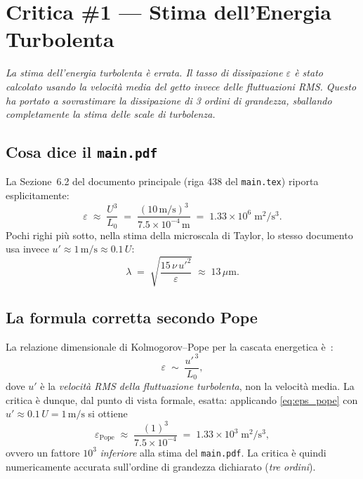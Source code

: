 \documentclass[11pt,a4paper]{article}
\newcommand{\mum}{\,\mu\mathrm{m}}
\begin{document}
\section{Critica \#1 — Stima dell'Energia Turbolenta}
\label{sec:c1}

\begin{citazione}
\textit{La stima dell'energia turbolenta è errata. Il tasso di
dissipazione $\varepsilon$ è stato calcolato usando la velocità
media del getto invece delle fluttuazioni RMS. Questo ha portato a
sovrastimare la dissipazione di 3 ordini di grandezza, sballando
completamente la stima delle scale di turbolenza.}
\end{citazione}

\subsection{Cosa dice il \texttt{main.pdf}}

La Sezione~6.2 del documento principale (riga 438 del
\texttt{main.tex}) riporta esplicitamente:
\begin{equation}
  \varepsilon \;\approx\; \frac{U^{3}}{L_{0}}
   \;=\; \frac{(10\,\mathrm{m/s})^{3}}{7.5\times 10^{-4}\,\mathrm{m}}
   \;=\; 1.33\times 10^{6}\;\mathrm{m}^{2}/\mathrm{s}^{3}.
  \label{eq:eps_main}
\end{equation}
Pochi righi più sotto, nella stima della microscala di Taylor, lo
stesso documento usa invece $u'\approx 1\,\mathrm{m/s}\approx 0.1\,U$:
\begin{equation}
  \lambda \;=\; \sqrt{\frac{15\,\nu\,u'^{2}}{\varepsilon}}
   \;\approx\; 13\mum.
  \label{eq:lambda_main}
\end{equation}

\subsection{La formula corretta secondo Pope}

La relazione dimensionale di Kolmogorov--Pope per la cascata
energetica è~\cite{Pope2000}:
\begin{equation}
  \varepsilon \;\sim\; \frac{u'^{\,3}}{L_{0}},
  \label{eq:eps_pope}
\end{equation}
dove $u'$ è la \emph{velocità RMS della fluttuazione turbolenta},
non la velocità media. La critica è dunque, dal punto di vista
formale, esatta: applicando \eqref{eq:eps_pope} con
$u'\approx 0.1\,U=1\,\mathrm{m/s}$ si ottiene
\begin{equation}
  \varepsilon_{\mathrm{Pope}}
   \;\approx\; \frac{(1)^{3}}{7.5\times 10^{-4}}
   \;=\; 1.33\times 10^{3}\;\mathrm{m}^{2}/\mathrm{s}^{3},
  \label{eq:eps_corr}
\end{equation}
ovvero un fattore $10^{3}$ \emph{inferiore} alla stima del
\texttt{main.pdf}. La critica è quindi numericamente accurata
sull'ordine di grandezza dichiarato (\emph{tre ordini}).
\end{document}
